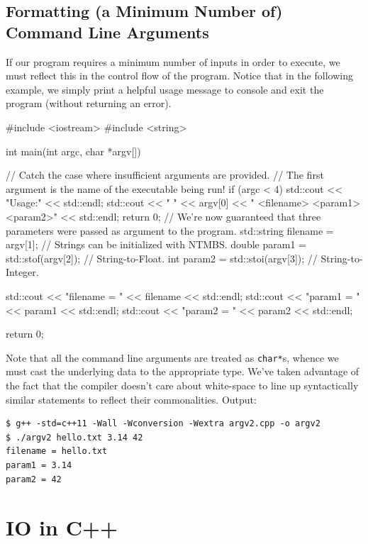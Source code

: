 \documentclass[12pt,letterpaper,twoside]{article}
\begin{document}
\subsection{Formatting ({\small a Minimum Number of}) Command Line Arguments}
If our program requires a minimum number of inputs in order to execute, we must
reflect this in the control flow of the program. Notice that in the following example, 
we simply print a helpful usage message to console and exit the program (without returning
an error).
\begin{cpp}
#include <iostream>
#include <string>

int main(int argc, char *argv[]) {
  // Catch the case where insufficient arguments are provided.
  // The first argument is the name of the executable being run!
  if (argc < 4) {
    std::cout << "Usage:" << std::endl;
    std::cout << " " << argv[0] << " <filename> <param1> <param2>" << std::endl;
    return 0;
  }
  // We're now guaranteed that three parameters were passed as argument to the program.
  std::string filename = argv[1];       // Strings can be initialized with NTMBS.
  double param1 = std::stof(argv[2]);   // String-to-Float.
  int param2    = std::stoi(argv[3]);   // String-to-Integer.

  std::cout << "filename = " << filename << std::endl;
  std::cout << "param1 = "   << param1   << std::endl;
  std::cout << "param2 = "   << param2   << std::endl;

  return 0;
}
\end{cpp}

Note that all the command line arguments are treated as \texttt{char*}s, whence we must 
cast the underlying data to the appropriate type. We've taken advantage
of the fact that the compiler doesn't care about white-space to line up syntactically
similar statements to reflect their commonalities.
Output:


{\small
\begin{verbatim}
$ g++ -std=c++11 -Wall -Wconversion -Wextra argv2.cpp -o argv2
$ ./argv2 hello.txt 3.14 42
filename = hello.txt
param1 = 3.14
param2 = 42
\end{verbatim}
}

\vspace{-3ex}
\section{IO in C++}
\vspace{-2ex}
\end{document}
